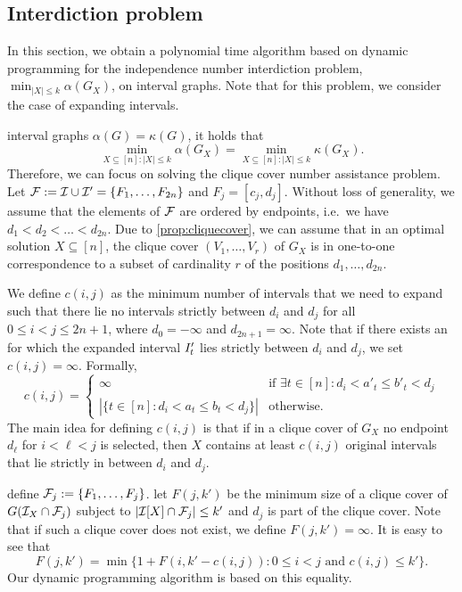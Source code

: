 \subsection{Interdiction problem}
\label{sec:independence-interdiction}
In this section, we obtain a polynomial time algorithm based on dynamic programming for the independence number interdiction problem,  $\min_{|X| \leq k} \alpha(G_X)$,
on interval graphs. Note that for this problem, we consider the case of expanding intervals.

 interval graphs $\alpha(G) = \kappa(G)$, it holds that 
\[ \min_{X \subseteq [n] \colon |X| \leq k } \alpha(G_X) = \min_{X \subseteq [n] \colon |X| \leq k} \kappa(G_X). \]
Therefore, we can focus on solving the clique cover number assistance problem.
Let $\mathcal{F} := \mathcal{I} \cup \mathcal{I}' = \{ F_1, \ldots, F_{2n} \}$ and $F_j = [c_j, d_j]$. Without loss of generality, we assume that the elements of $\mathcal{F}$ are ordered by endpoints, i.e.\ we have $d_1 < d_2 < \dots < d_{2n}$. 
Due to \cref{prop:cliquecover}, we can assume that in an optimal solution $X \subseteq [n]$, the clique cover $(V_1, \dots, V_r)$ of $G_X$ is in one-to-one correspondence to a  subset of cardinality $r$ of the
positions $d_1, \dots, d_{2n}$.

We define $c(i,j)$ 
as the minimum number of intervals that we need to expand such that there lie no 
intervals strictly between $d_i$ and $d_j$ for all $0 \leq i < j \leq 2n+1$, where $d_0=-\infty$ and $d_{2n+1} = \infty$.
Note that if there exists an  for which the expanded interval $I'_{t}$ lies strictly between $d_i$ and $d_j$, 
we set $c(i,j) = \infty$. Formally,
\[ c(i,j) = \begin{cases} \infty & \text{if } \exists t \in [n] \colon d_i < a'_t \leq b'_t < d_j\\ |\{ t \in [n] \colon d_i < a_t \leq b_t < d_j \}| & \text{otherwise}. \end{cases} \]
The main idea for defining $c(i,j)$ is that if in a clique cover of $G_X$ no 
endpoint $d_{\ell}$ for $i<\ell<j$ is selected, then $X$ contains at least $c(i,j)$ original intervals that lie strictly in between $d_i$ and $d_j$.

 define $\mathcal{F}_j := \{F_1, \dots, F_j\}$.
 let $F(j,k')$ be the minimum size of a clique cover of $G(\mathcal{I}_X \cap \mathcal{F}_j)$ subject to 
$|\mathcal{I}[X] \cap \mathcal{F}_j| \leq k'$ and $d_j$ is part of the clique cover. Note that if such a clique cover does not exist, 
we define $F(j,k')=\infty$. 
It is easy to see that
    \[ F(j,k') = \min \{ 1 + F(i, k'-c(i,j)) \colon 0 \leq i < j\text{ and } c(i,j) \leq k' \}. \]
Our dynamic programming algorithm is based on this equality.


